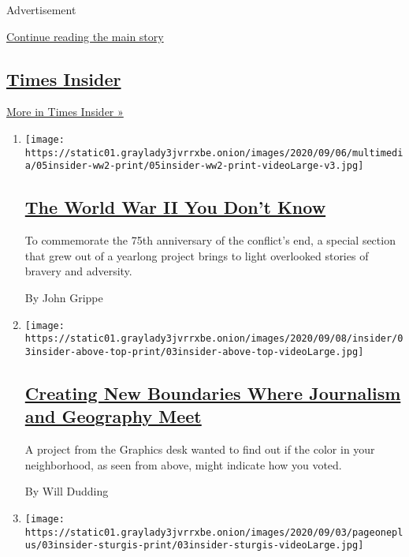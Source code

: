 Advertisement

\protect\hyperlink{after-mid1}{Continue reading the main story}

\hypertarget{times-insider-3}{%
\subsection{\texorpdfstring{\href{/series/times-insider}{Times
Insider}}{Times Insider}}\label{times-insider-3}}

\href{/series/times-insider}{More in Times Insider »}

\begin{enumerate}
\def\labelenumi{\arabic{enumi}.}
\item
  \texttt{[image: https://static01.graylady3jvrrxbe.onion/images/2020/09/06/multimedia/05insider-ww2-print/05insider-ww2-print-videoLarge-v3.jpg]}

  \hypertarget{the-world-war-ii-you-dont-know}{%
  \subsection{\texorpdfstring{\href{/2020/09/05/insider/World-War-II-end.html}{The
  World War II You Don't
  Know}}{The World War II You Don't Know}}\label{the-world-war-ii-you-dont-know}}

  To commemorate the 75th anniversary of the conflict's end, a special
  section that grew out of a yearlong project brings to light overlooked
  stories of bravery and adversity.

  By John Grippe
\item
  \texttt{[image: https://static01.graylady3jvrrxbe.onion/images/2020/09/08/insider/03insider-above-top-print/03insider-above-top-videoLarge.jpg]}

  \hypertarget{creating-new-boundaries-where-journalism-and-geography-meet}{%
  \subsection{\texorpdfstring{\href{/2020/09/04/insider/journalism-and-geography.html}{Creating
  New Boundaries Where Journalism and Geography
  Meet}}{Creating New Boundaries Where Journalism and Geography Meet}}\label{creating-new-boundaries-where-journalism-and-geography-meet}}

  A project from the Graphics desk wanted to find out if the color in
  your neighborhood, as seen from above, might indicate how you voted.

  By Will Dudding
\item
  \texttt{[image: https://static01.graylady3jvrrxbe.onion/images/2020/09/03/pageoneplus/03insider-sturgis-print/03insider-sturgis-videoLarge.jpg]}


\end{enumerate}
